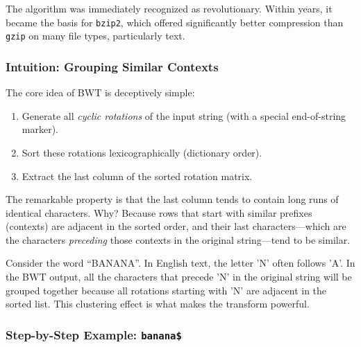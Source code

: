 The algorithm was immediately recognized as revolutionary. Within years, it became the basis for \texttt{bzip2}, which offered significantly better compression than \texttt{gzip} on many file types, particularly text.

\subsubsection{Intuition: Grouping Similar Contexts}

The core idea of BWT is deceptively simple:

\begin{enumerate}
    \item Generate all \emph{cyclic rotations} of the input string (with a special end-of-string marker).
    \item Sort these rotations lexicographically (dictionary order).
    \item Extract the last column of the sorted rotation matrix.
\end{enumerate}

The remarkable property is that the last column tends to contain long runs of identical characters. Why? Because rows that start with similar prefixes (contexts) are adjacent in the sorted order, and their last characters—which are the characters \emph{preceding} those contexts in the original string—tend to be similar.

\begin{examplebox}
Consider the word ``BANANA''. In English text, the letter 'N' often follows 'A'. In the BWT output, all the characters that precede 'N' in the original string will be grouped together because all rotations starting with 'N' are adjacent in the sorted list. This clustering effect is what makes the transform powerful.
\end{examplebox}


\subsubsection{Step-by-Step Example: \texttt{banana\$}}

